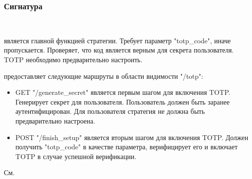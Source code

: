 \subsubsection{Сигнатура\label{signature}}%
\label{page-FPauth-strategies-module-FPauth+u+strategies-module-TOTP-module-Make-type-entity}\\
\label{page-FPauth-strategies-module-FPauth+u+strategies-module-TOTP-module-Make-val-call}\begin{ocamlindent} является главной функцией стратегии. Требует параметр "totp\_code", иначе пропускается. Проверяет, что код является верным для секрета пользователя. TOTP необходимо предварительно настроить.\end{ocamlindent}%
\medbreak
\label{page-FPauth-strategies-module-FPauth+u+strategies-module-TOTP-module-Make-val-routes}\begin{ocamlindent} предоставляет следующие маршруты в области видимости "/totp":\begin{itemize}\item{GET "/generate\_secret" является первым шагом для включения TOTP. Генерирует секрет для пользователя. Пользователь должен быть заранее аутентифицирован. Для пользователя стратегия не должна быть предварительно настроена.}%
\item{POST "/finish\_setup" является вторым шагом для включения TOTP. Должен получить "totp\_code" в качестве параметра, верифицирует его и включает TOTP в случае успешной верификации.}\end{itemize}%
\end{ocamlindent}%
\medbreak
\label{page-FPauth-strategies-module-FPauth+u+strategies-module-TOTP-module-Make-val-name}\begin{ocamlindent}См. \hyperref[page-FPauth-strategies-module-FPauth+u+strategies-module-TOTP-val-name]{}\end{ocamlindent}%
\medbreak



